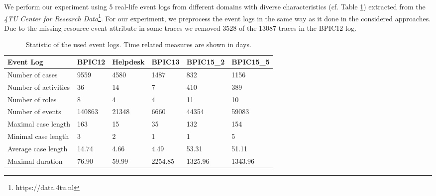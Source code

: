 \documentclass[runningheads]{llncs}
\begin{document}
We perform our experiment using 5 real-life event logs from different domains with diverse characteristics (cf. Table \ref{used-event-logs}) extracted from the \textit{4TU Center for Research Data}\footnote{https://data.4tu.nl}. For our experiment, we preprocess the event logs in the same way as it done in the considered approaches. Due to the missing resource event attribute in some traces we removed 3528 of the 13087 traces in the BPIC12 log. 
\begin{table}[t]
	\setlength{\belowcaptionskip}{-16pt}
	\begin{tabularx}{\textwidth}{p{3cm}p{1.7cm}p{1.7cm}p{1.7cm}p{1.7cm}p{1.7cm}}
		\toprule
		{\small \textbf{Event Log}}	& {\small \textbf{BPIC12}}   			& \textbf{Helpdesk}  & \textbf{BPIC13}  	& \textbf{BPIC15\_2} & \textbf{BPIC15\_5}   \\ \midrule
		Number of cases		&  9559 		   	&  4580  		& 1487  		& 832 & 1156   \\ 
		Number of activities		& 36  		  	& 14 		&  7		&   410 & 389 \\ 
		Number of roles & 8 & 4 & 4 & 11  & 10\\
		Number of events		&  	140863		&  21348		&  	6660	&   44354 & 59083\\ 
		Maximal case length & 163  & 15 & 35&  132 & 154\\
		Minimal case length & 3 & 2 & 1&   1& 5\\
		Average case length & 14.74 & 4.66 & 4.49 & 53.31  & 51.11 \\ 
		Maximal duration & 76.90 & 59.99 & 2254.85 &  1325.96 & 1343.96 \\  \bottomrule
	\end{tabularx}
	\caption{Statistic of the used event logs. Time related measures are shown in days.}
	\label{used-event-logs}
\end{table}
\vspace{-18pt}
\end{document}
